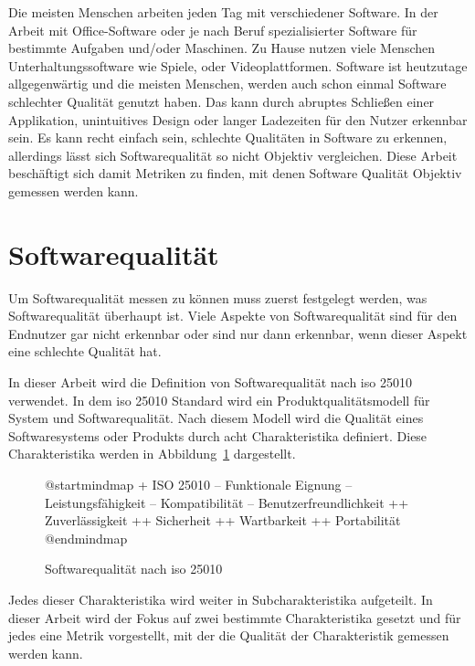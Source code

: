 \documentclass[12pt, a4paper, ngerman]{article}
\begin{document}
Die meisten Menschen arbeiten jeden Tag mit verschiedener Software.
In der Arbeit mit Office-Software oder je nach Beruf spezialisierter
Software für bestimmte Aufgaben und/oder Maschinen.
Zu Hause nutzen viele Menschen Unterhaltungssoftware wie Spiele,
oder Videoplattformen.
Software ist heutzutage allgegenwärtig und die meisten Menschen,
werden auch schon einmal Software schlechter Qualität genutzt haben.
Das kann durch abruptes Schließen einer Applikation,
unintuitives Design oder langer Ladezeiten
für den Nutzer erkennbar sein.
Es kann recht einfach sein,
schlechte Qualitäten in Software zu erkennen,
allerdings lässt sich Softwarequalität so nicht Objektiv vergleichen.
Diese Arbeit beschäftigt sich damit Metriken zu finden,
mit denen Software Qualität Objektiv gemessen werden kann.

\section{Softwarequalität}

Um Softwarequalität messen zu können muss zuerst festgelegt werden,
was Softwarequalität überhaupt ist.
Viele Aspekte von Softwarequalität sind für den Endnutzer gar nicht
erkennbar oder sind nur dann erkennbar,
wenn dieser Aspekt eine schlechte Qualität hat.

In dieser Arbeit wird die Definition von Softwarequalität
nach \ac{iso} 25010~\cite{ISO25010} verwendet.
In dem \ac{iso} 25010 Standard wird ein Produktqualitätsmodell
für System und Softwarequalität.
Nach diesem Modell wird die Qualität eines Softwaresystems oder Produkts
durch acht Charakteristika definiert.
Diese Charakteristika werden in Abbildung~\ref*{fig:uml:softwarequality} dargestellt.

\begin{figure}
  \centering
  \begin{plantuml}
    @startmindmap
    + ISO 25010 
    -- Funktionale Eignung
    -- Leistungsfähigkeit
    -- Kompatibilität
    -- Benutzerfreundlichkeit
    ++ Zuverlässigkeit
    ++ Sicherheit
    ++ Wartbarkeit
    ++ Portabilität
    @endmindmap
  \end{plantuml}
  \caption{Softwarequalität nach \ac{iso} 25010~\cite{ISO25010}}
  \label{fig:uml:softwarequality}
\end{figure}

Jedes dieser Charakteristika wird weiter in Subcharakteristika aufgeteilt.
In dieser Arbeit wird der Fokus auf zwei bestimmte Charakteristika gesetzt
und für jedes eine Metrik vorgestellt,
mit der die Qualität der Charakteristik gemessen werden kann.
\end{document}
